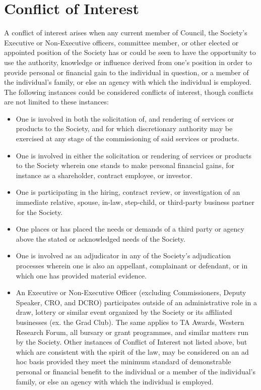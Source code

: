 \section{Conflict of Interest}
\begin{longenum}[ label*=\thesection.\arabic*., align=left]
	\item A conflict of interest arises when any current member of Council, the Society's Executive or Non-Executive officers, committee member, or other elected or appointed position of the Society has or could be seen to have the opportunity to use the authority, knowledge or influence derived from one's position in order to provide personal or financial gain to the individual in question, or a member of the individual's family, or else an agency with which the individual is employed. The following instances could be  considered conflicts of interest, though conflicts are not limited to these instances: 
    \begin{itemize}
    	\item One is involved in both the solicitation of, and rendering of services or products to the Society, and for which discretionary authority may be exercised at any stage  of the commissioning of said services or products.
        \item One is involved in either the solicitation or rendering of services or products to the Society wherein one stands to make personal financial gains, for instance as a shareholder, contract employee, or investor.
        \item One is participating in the hiring, contract review, or investigation of an immediate relative, spouse, in-law, step-child, or third-party business partner for the Society. 
        \item One places or has placed the needs or demands of a third party or agency above the stated or acknowledged needs of the Society. 
        \item One is involved as an adjudicator in any of the Society's adjudication processes wherein one is also an appellant, complainant or defendant, or in which one has provided material evidence.
        \item An Executive or Non-Executive Officer (excluding
Commissioners, Deputy Speaker, CRO, and DCRO) participates outside of an administrative role in a draw, lottery or similar event organized by the Society or its affiliated businesses (ex. the Grad Club). The same applies to TA Awards, Western Research Forum, all bursary or grant programmes, and similar matters run by the Society. Other instances of Conflict of Interest not listed above, but which are consistent with the spirit of the law, may be considered on an ad hoc basis provided they meet the minimum standard of demonstrable personal or financial benefit to the individual or a member of the individual's family,  or else an agency with which the individual is employed.

\end{itemize}
\end{longenum}
